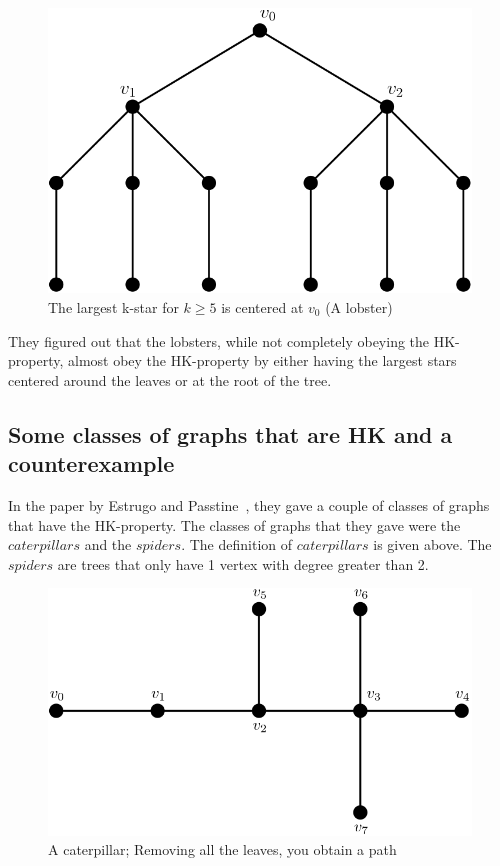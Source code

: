 \documentclass{amsart}
\theoremstyle{definition}
\begin{document}
\begin{figure}[hbt!]
	\centering
	\includegraphics[width=0.6\linewidth]{images/lobster_graph.png}
	\caption{The largest k-star for $k \geq 5$ is centered at $v_0$ (A lobster)}
\end{figure}


They figured out that the lobsters, while not completely obeying the HK-property, almost obey the HK-property by either having the largest stars centered around the leaves or at the root of the tree.

\newpage

\subsection{Some classes of graphs that are HK and a counterexample}

In the paper by Estrugo and Passtine~\cite{MR4245360}, they gave a couple of classes of graphs that have the HK-property. The classes of graphs that they gave were the $caterpillars$ and the $spiders$. The definition of $caterpillars$ is given above. The $spiders$ are trees that only have 1 vertex with degree greater than 2.

\begin{figure}[hbt!]
	\centering
	\includegraphics[width=0.75\linewidth]{images/caterpillar_graph.png}
	\caption{A caterpillar; Removing all the leaves, you obtain a path}
\end{figure}
\end{document}
